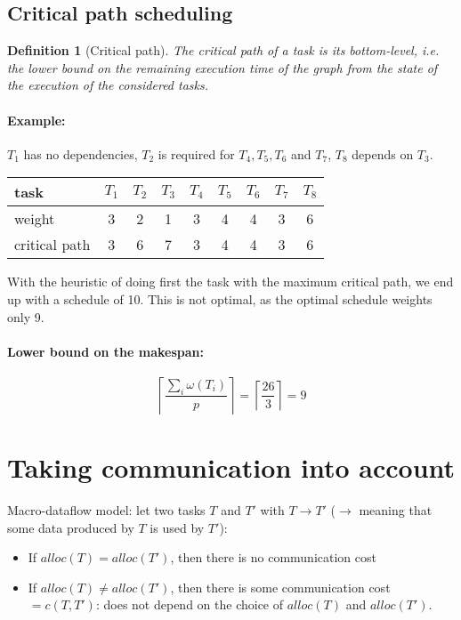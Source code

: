 \documentclass{article}
\newtheorem{defi}{Definition}
\begin{document}
\subsection{Critical path scheduling}
\begin{defi}[Critical path]
The critical path of a task is its bottom-level, i.e. the lower bound on the remaining execution time of the graph from the state of the execution of the considered tasks.
\end{defi}

\paragraph{Example:}
$T_1$ has no dependencies, $T_2$ is required for $T_4, T_5, T_6$ and $T_7$, $T_8$ depends on $T_3$.

\begin{center}
\begin{tabular}{l | c | c |c|c|c|c|c|c}
task & $T_1$ & $T_2$ & $T_3$ & $T_4$ & $T_5$ & $T_6$ & $T_7$ & $T_8$ \\
\hline
weight & 3 & 2 & 1& 3 & 4 & 4 & 3 & 6\\
\hline
critical path & 3 & 6 & 7 & 3 & 4 & 4 & 3 & 6\\
\end{tabular}
\end{center}

With the heuristic of doing first the task with the maximum critical path, we end up with a schedule of 10. This is not optimal, as the optimal schedule weights only 9.

\paragraph{Lower bound on the makespan:}
\[ \left\lceil \frac{\sum_{i}\omega (T_i)}{p}\right\rceil = \left\lceil \frac{26}{3} \right\rceil = 9\]


\section{Taking communication into account}
Macro-dataflow model: let two tasks $T$ and $T'$ with $T \to T'$ ($\to$ meaning that some data produced by $T$ is used by $T'$):
\begin{itemize}
\item If $alloc(T)=alloc(T')$, then there is no communication cost
\item If $alloc(T)\neq alloc(T')$, then there is some communication cost $= c(T,T')$: does not depend on the choice of $alloc(T)$ and $alloc(T')$.
\end{itemize}
\end{document}

